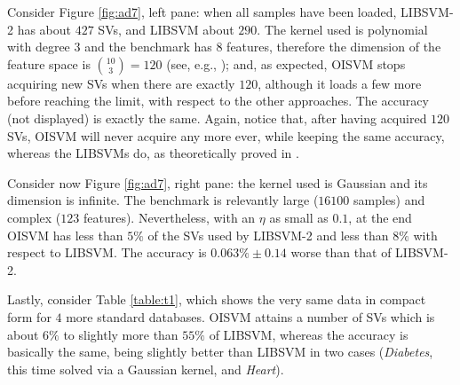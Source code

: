 Consider Figure \ref{fig:ad7}, left pane: when all samples have been
loaded, LIBSVM-2 has about $427$ SVs, and LIBSVM about $290$. The
kernel used is polynomial with degree $3$ and the benchmark has $8$
features, therefore the dimension of the feature space is
$\binom{10}{3} = 120$ (see, e.g., \cite{Burges98}); and, as expected,
OISVM stops acquiring new SVs when there are exactly $120$, although
it loads a few more before reaching the limit, with respect to the
other approaches. The accuracy (not displayed) is exactly the
same. Again, notice that, after having acquired $120$ SVs, OISVM will
never acquire any more ever, while keeping the same accuracy, whereas
the LIBSVMs do, as theoretically proved in \cite{Steinwart03}.

Consider now Figure \ref{fig:ad7}, right pane: the kernel used is
Gaussian and its dimension is infinite. The benchmark is relevantly
large ($16100$ samples) and complex ($123$ features). Nevertheless,
with an $\eta$ as small as $0.1$, at the end OISVM has less than $5\%$
of the SVs used by LIBSVM-2 and less than $8\%$ with respect to
LIBSVM. The accuracy is $0.063\%\pm0.14$ worse than that of LIBSVM-2.

Lastly, consider Table \ref{table:t1}, which shows the very same data
in compact form for $4$ more standard databases. OISVM attains a
number of SVs which is about $6\%$ to slightly more than $55\%$ of
LIBSVM, whereas the accuracy is basically the same, being slightly
better than LIBSVM in two cases (\emph{Diabetes}, this time solved via
a Gaussian kernel, and \emph{Heart}).
